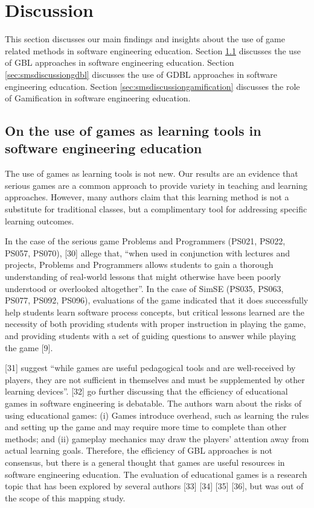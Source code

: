 \section{Discussion}
\label{sec:smsdiscussion}

This section discusses our main findings and insights about the use of game related methods in software engineering education. Section \ref{sec:smsdiscussiongbl} discusses the use of GBL approaches in software engineering education. Section \ref{sec:smsdiscussiongdbl} discusses the use of GDBL approaches in software engineering education. Section \ref{sec:smsdiscussiongamification} discusses the role of Gamification in software engineering education.

\subsection{On the use of games as learning tools in software engineering education}
\label{sec:smsdiscussiongbl}

The use of games as learning tools is not new. Our results are an evidence that serious games are a common approach to provide variety in teaching and learning approaches. However, many authors claim that this learning method is not a substitute for traditional classes, but a complimentary tool for addressing specific learning outcomes.

In the case of the serious game Problems and Programmers (PS021, PS022, PS057, PS070), \cite{Baker:2005} [30] allege that, “when used in conjunction with lectures and projects, Problems and Programmers allows students to gain a thorough understanding of real-world lessons that might otherwise have been poorly understood or overlooked altogether”. In the case of SimSE (PS035, PS063, PS077, PS092, PS096), evaluations of the game indicated that it does successfully help students learn software process concepts, but critical lessons learned are the necessity of both providing students with proper instruction in playing the game, and providing students with a set of guiding questions to answer while playing the game \citep{Navarro:2009}[9].

\citep{Caulfield:2011}[31] suggest “while games are useful pedagogical tools and are well-received by players, they are not sufficient in themselves and must be supplemented by other learning devices”. \cite{Heikkila:2016}[32] go further discussing that the efficiency of educational games in software engineering is debatable. The authors warn about the risks of using educational games: (i) Games introduce overhead, such as learning the rules and setting up the game and may require more time to complete than other methods; and (ii) gameplay mechanics may draw the players’ attention away from actual learning goals. Therefore, the efficiency of GBL approaches is not consensus, but there is a general thought that games are useful resources in software engineering education. The evaluation of educational games is a research topic that has been explored by several authors \citep{Peixoto:2014, Andriano:2011, Navarro:2007, Savi:2011}[33] [34] [35] [36], but was out of the scope of this mapping study.

